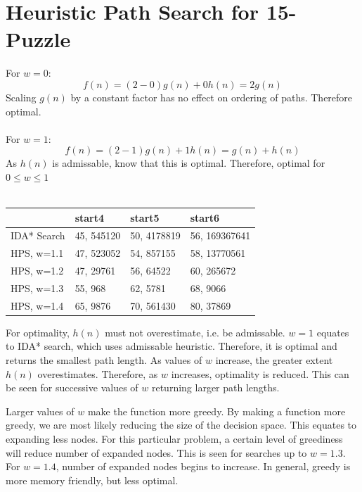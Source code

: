 \documentclass[11pt, english]{article}
\begin{document}
\section{Heuristic Path Search for 15-Puzzle}
For $w=0$:
$$
f(n) = (2 - 0)g(n) + 0h(n) 
     = 2g(n)
$$
Scaling $g(n)$ by a constant factor has no effect on ordering of paths.
Therefore optimal.\\\\
For $w=1$:
$$
f(n) = (2 - 1)g(n) + 1h(n) 
     = g(n) + h(n)
$$
As $h(n)$ is admissable, know that this is optimal.
Therefore, optimal for $0 \leq w \leq 1$\\\\

\begin{table}[ht]
\centering
\begin{tabularx}{\linewidth}{X|X|X|X}
  & start4 & start5 & start6 \\\hline
IDA* Search & 45, 545120 & 50, 4178819 & 56, 169367641 \\
HPS, w=1.1   & 47, 523052 & 54, 857155  & 58, 13770561  \\
HPS, w=1.2   & 47, 29761  & 56, 64522   & 60, 265672    \\
HPS, w=1.3   & 55, 968    & 62, 5781    & 68, 9066      \\
HPS, w=1.4   & 65, 9876   & 70, 561430  & 80, 37869     \\
\end{tabularx}
\end{table}

For optimality, $h(n)$ must not overestimate, i.e. be admissable.
$w=1$ equates to IDA* search, which uses admissable heuristic.
Therefore, it is optimal and returns the smallest path length.
As values of $w$ increase, the greater extent $h(n)$ overestimates.
Therefore, as $w$ increases, optimality is reduced.
This can be seen for successive values of $w$ returning larger path lengths.

Larger values of $w$ make the function more greedy.
By making a function more greedy, we are most likely reducing the size of the decision space.
This equates to expanding less nodes.
For this particular problem, a certain level of greediness will reduce number of expanded nodes.
This is seen for searches up to $w=1.3$.
For $w=1.4$, number of expanded nodes begins to increase.
In general, greedy is more memory friendly, but less optimal.
\end{document}
